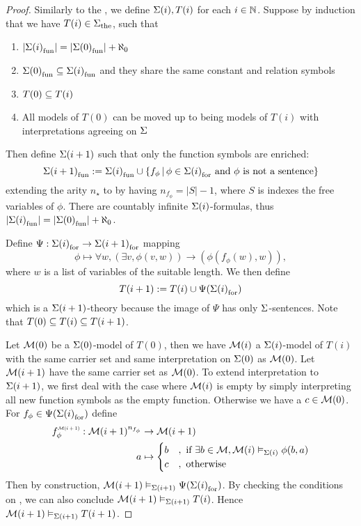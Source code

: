 \begin{proof}
    Similarly to the , 
    we define $\Sigma(i), T(i)$ for each $i \in \mathbb{N}$.
    Suppose by induction that we have $T(i) \in {\Sigma}_\mathrm{the}$, 
    such that 
    \begin{enumerate}
        \item $|{\Sigma(i)}_\mathrm{fun}| = |{\Sigma(0)}_\mathrm{fun}| + \aleph_0$
        \item ${\Sigma(0)}_\mathrm{fun} \subseteq {\Sigma(i)}_\mathrm{fun}$
            and they share the same constant and relation symbols
        \item $T(0) \subseteq T(i)$
        \item All models of $T(0)$ can be moved up to being models of $T(i)$
            with interpretations agreeing on $\Sigma$
    \end{enumerate} 
    Then define $\Sigma(i+1)$ such that only the function symbols are enriched:
    \[
        {\Sigma(i+1)}_\mathrm{fun} := {\Sigma(i)}_\mathrm{fun} \cup 
        \left\{f_{\phi} \,|\, \phi \in {\Sigma(i)}_\mathrm{for} 
        \text{ and $\phi$ is not a sentence}\right\}
    \]
    extending the arity $n_\star$ to by having 
    $n_{f_\phi} = |S| - 1$, where $S$ is indexes the free variables of $\phi$.
    There are countably infinite $\Sigma(i)$-formulas, 
    thus $|{\Sigma(i)}_\mathrm{fun}| = |{\Sigma(0)}_\mathrm{fun}| + \aleph_0$.

    Define $\Psi : {\Sigma(i)}_\mathrm{for} \to {\Sigma(i+1)}_\mathrm{for}$ mapping 
    \[
        \phi \mapsto \forall w, (\exists v, \phi(v,w)) \to (\phi(f_\phi (w),w)),
    \] 
    where $w$ is a list of variables of the suitable length. 
    We then define 
    \[
        T(i+1) := T(i) \cup \Psi({\Sigma(i)}_\mathrm{for})
    \]
    which is a $\Sigma(i+1)$-theory because the image of $\Psi$ has only 
    $\Sigma$-sentences.
    Note that $T(0) \subseteq T(i) \subseteq T(i+1)$.

    Let $\mathcal{M}(0)$ be a $\Sigma(0)$-model of $T(0)$, 
    then we have $\mathcal{M}(i)$ a $\Sigma(i)$-model of $T(i)$ 
    with the same carrier set and same
    interpretation on $\Sigma(0)$ as $\mathcal{M}(0)$.
    Let $\mathcal{M}(i+1)$ have the same carrier set as $\mathcal{M}(0)$.
    To extend interpretation to $\Sigma(i+1)$,
    we first deal with the case where ${\mathcal{M}(i)}$ is empty by simply
    interpreting all new function symbols as the empty function.
    Otherwise we have a $c \in {\mathcal{M}(0)}$. 
    For $f_\phi \in \Psi({\Sigma(i)}_\mathrm{for})$ define
    \begin{align*}
        \modintp{\MM(i+1)}{f_\phi} : 
        {\MM(i+1)}^{n_{f_\phi}} &\to {\MM(i+1)}\\
        a &\mapsto \begin{cases}
            b &, \text{ if } \exists b \in {\MM}, 
            \MM(i) \model{\Si(i)} \phi(b,a)\\
            c &, \text{ otherwise}
        \end{cases}\\
    \end{align*}
    Then by construction, 
    $\mathcal{M}(i+1) \vDash_{\Sigma(i+1)} \Psi({\Sigma(i)}_\mathrm{for})$.
    By checking the conditions on ,
    we can also conclude
    $\mathcal{M}(i+1) \vDash_{\Sigma(i+1)} T(i)$.
    Hence $\mathcal{M}(i+1) \vDash_{\Sigma(i+1)} T(i+1)$.
    

\end{proof}
